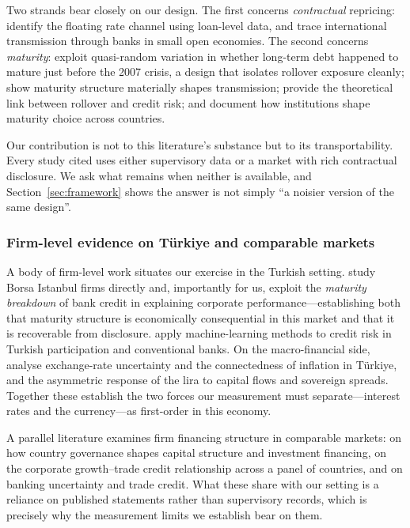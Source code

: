 \documentclass[review,12pt,authoryear]{elsarticle}
\theoremstyle{plain}
\theoremstyle{definition}
\begin{document}
Two strands bear closely on our design. The first concerns \emph{contractual}
repricing: \citet{ippolito2018} identify the floating rate channel using
loan-level data, and \citet{auer2019} trace international transmission through
banks in small open economies. The second concerns \emph{maturity}:
\citet{almeida2012} exploit quasi-random variation in whether long-term debt
happened to mature just before the 2007 crisis, a design that isolates rollover
exposure cleanly; \citet{jungherr2024} show maturity structure materially shapes
transmission; \citet{hexiong2012} provide the theoretical link between rollover
and credit risk; and \citet{demirguc1999} document how institutions shape
maturity choice across countries.

Our contribution is not to this literature's substance but to its
transportability. Every study cited uses either supervisory data or a market
with rich contractual disclosure. We ask what remains when neither is available,
and Section~\ref{sec:framework} shows the answer is not simply ``a noisier
version of the same design''.

\subsubsection{Firm-level evidence on T\"{u}rkiye and comparable markets}

A body of firm-level work situates our exercise in the Turkish setting.
\citet{bilgin2023} study Borsa Istanbul firms directly and, importantly for us,
exploit the \emph{maturity breakdown} of bank credit in explaining corporate
performance---establishing both that maturity structure is economically
consequential in this market and that it is recoverable from disclosure.
\citet{sugozu2025} apply machine-learning methods to credit risk in Turkish
participation and conventional banks. On the macro-financial side,
\citet{citci2023} analyse exchange-rate uncertainty and the connectedness of
inflation in T\"{u}rkiye, and \citet{akbal2026} the asymmetric response of the
lira to capital flows and sovereign spreads. Together these establish the two
forces our measurement must separate---interest rates and the currency---as
first-order in this economy.

A parallel literature examines firm financing structure in comparable markets:
\citet{cam2022} on how country governance shapes capital structure and
investment financing, \citet{karakoc2022} on the corporate growth--trade credit
relationship across a panel of countries, and \citet{huynh2024} on banking
uncertainty and trade credit. What these share with our setting is a reliance on
published statements rather than supervisory records, which is precisely why the
measurement limits we establish bear on them.
\end{document}
